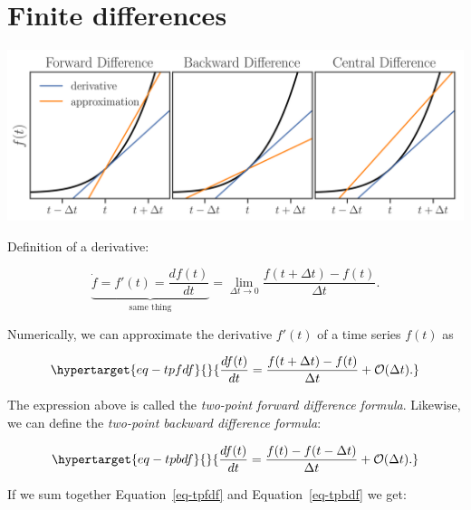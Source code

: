 \documentclass[
  letterpaper,
  DIV=11,
  numbers=noendperiod,
  oneside]{scrreprt}
\begin{document}
\hypertarget{finite-differences}{%
\chapter{Finite differences}\label{finite-differences}}

\includegraphics{rates-of-change/central_diff.png}

Definition of a derivative:

\[
\underbrace{\dot{f} = f'(t) = \frac{df(t)}{dt}}_{\text{same thing}} = \lim_{\Delta t \rightarrow 0} \frac{f(t+\Delta t) - f(t)}{\Delta t}.
\]

Numerically, we can approximate the derivative \(f'(t)\) of a time
series \(f(t)\) as

\begin{equation}\protect\hypertarget{eq-tpfdf}{}{
\frac{df(t)}{dt} = \frac{f(t+\Delta t) - f(t)}{\Delta t} + \mathcal{O}(\Delta t).
}\label{eq-tpfdf}\end{equation}


The expression above is called the \emph{two-point forward difference
formula}. Likewise, we can define the \emph{two-point backward
difference formula}:

\begin{equation}\protect\hypertarget{eq-tpbdf}{}{
\frac{df(t)}{dt} = \frac{f(t) - f(t-\Delta t)}{\Delta t} + \mathcal{O}(\Delta t).
}\label{eq-tpbdf}\end{equation}

If we sum together Equation~\ref{eq-tpfdf} and Equation~\ref{eq-tpbdf}
we get:
\end{document}

